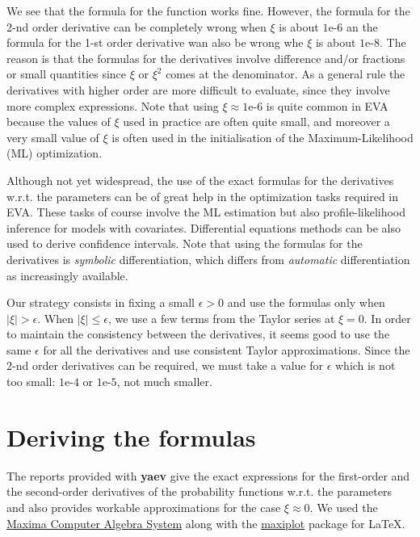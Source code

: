 \documentclass[11pt]{article}\usepackage[]{graphicx}\usepackage[]{xcolor}
\begin{document}
\noindent
We see that the formula for the function works fine. However, the
formula for the 2-nd order derivative can be completely wrong when
$\xi$ is about $\text{1e-6}$ an the formula for the 1-st order
derivative wan also be wrong whe $\xi$ is about $\text{1e-8}$. The
reason is that the formulas for the derivatives involve difference
and/or fractions or small quantities since $\xi$ or $\xi^2$ comes at
the denominator. As a general rule the derivatives with higher order
are more difficult to evaluate, since they involve more complex
expressions.  Note that using $\xi \approx \text{1e-6}$ is quite
common in EVA because the values of $\xi$ used in practice are often
quite small, and moreover a very small value of $\xi$ is often used in
the initialisation of the Maximum-Likelihood (ML) optimization.

Although not yet widespread, the use of the exact formulas for the
derivatives w.r.t. the parameters can be of great help in the
optimization tasks required in EVA. These tasks of course involve the
ML estimation but also profile-likelihood inference for models with
covariates. Differential equations methods can be also used to derive
confidence intervals. Note that using the formulas for the derivatives
is \textit{symbolic} differentiation, which differs from
\textit{automatic} differentiation as increasingly available.

Our strategy consists in fixing a small $\epsilon >0$ and use the
formulas only when $|\xi| > \epsilon$. When
$|\xi| \leqslant \epsilon$, we use a few terms from the Taylor series
at $\xi =0$. In order to maintain the consistency between the
derivatives, it seems good to use the same $\epsilon$ for all the
derivatives and use consistent Taylor approximations. Since the $2$-nd
order derivatives can be required, we must take a value for
$\epsilon$ which is not too small: $\text{1e-4}$ or $\text{1e-5}$, not
much smaller.

\section{Deriving the formulas}

The reports provided with \textbf{yaev} give the exact expressions for
the first-order and the second-order derivatives of the probability
functions w.r.t. the parameters and also provides workable
approximations for the case $\xi \approx 0$. We used the
\href{https://maxima.sourceforge.io/}{Maxima Computer Algebra System}
along with the
\href{https://maxima.sourceforge.io/contrib/maxiplot/maxiplot.sty}{maxiplot}
package for \LaTeX{}.
\end{document}
